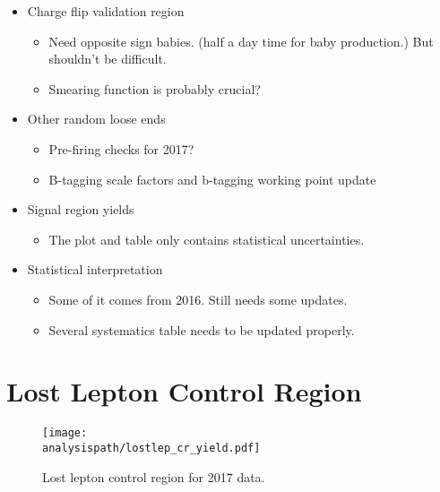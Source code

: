 \documentclass[12pt]{article}
\newcommand{\analysispath}{/home/users/phchang/public_html/analysis/www/code/WWWAnalysisRun2/analysis/plots/WWW2017_v4.0.6/test22}
\begin{document}
\begin{itemize}
    \item Charge flip validation region
        \begin{itemize}
            \item Need opposite sign babies. (half a day time for baby production.) But shouldn't be difficult.
            \item Smearing function is probably crucial?
        \end{itemize}
    \item Other random loose ends
        \begin{itemize}
            \item Pre-firing checks for 2017?
            \item B-tagging scale factors and b-tagging working point update
        \end{itemize}
    \item Signal region yields
        \begin{itemize}
            \item The plot and table only contains statistical uncertainties.
        \end{itemize}
    \item Statistical interpretation
        \begin{itemize}
            \item Some of it comes from 2016. Still needs some updates.
            \item Several systematics table needs to be updated properly.
        \end{itemize}
\end{itemize}


\section{Lost Lepton Control Region}



\begin{figure}[!htb]
    \centering
    \texttt{[image: \\analysispath/lostlep\_cr\_yield.pdf]}
    \caption{
        \label{fig:2017:lostlepcr} Lost lepton control region for 2017 data.
    }
\end{figure}



\end{document}
